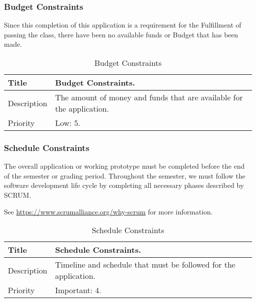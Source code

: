 \subsubsection{Budget Constraints}
  \label{system-constraints/budget-and-schedule/budget-title}
  Since this completion of this application is a requirement for the 
Fulfillment of passing the class, there have been no available funds or
Budget that has been made.

  \begin{table}[h!]
    \caption{Budget Constraints}
    \label{system-constraints/budget-and-schedule/budget-table}
    \begin{tabularx}{\textwidth}{|l|X|}
      \hline
      Title       & Budget Constraints. \\ \hline
      Description & The amount of money and funds that are available for
                    the application. \\ \hline
      Priority    & Low: 5. \\ \hline
    \end{tabularx}
  \end{table}

\subsubsection{Schedule Constraints}
 The overall application or working prototype must be completed before the 
end of the semester or grading period. Throughout the semester, we must 
follow the software development life cycle by completing all necessary phases 
described by SCRUM.

  See \url{https://www.scrumalliance.org/why-scrum} for more information.

  \begin{table}[h!]
    \caption{Schedule Constraints}
    \label{system-constraints/budget-and-schedule/schedule-table}
    \begin{tabularx}{\textwidth}{|l|X|}
      \hline
      Title       & Schedule Constraints. \\ \hline
    Description &   Timeline and schedule that must be followed for the application.
                    \\ \hline
      Priority    & Important: 4. \\ \hline
    \end{tabularx}
  \end{table}
